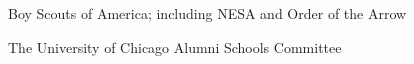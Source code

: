 


\begin{small}
	Boy Scouts of America; including NESA and Order of the Arrow\vspace{-0.75em}
	
	The University of Chicago Alumni Schools Committee
	
\end{small}